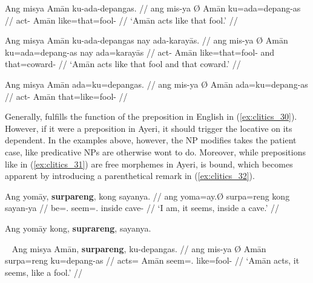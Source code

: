 \a\label{ex:clitics_30d}\begingl
	\gla Ang misya {} Amān ku-ada-depangas. //
	\glb ang mis-ya Ø Amān ku=ada=depang-as //
	\glc \AgtT{} act-\TsgM{} \Top{} Amān like=that=fool-\Parg{} //
	\glft `Amān acts like that fool.' //
\endgl

\a\label{ex:clitics_30e}\begingl
	\gla Ang misya {} Amān ku-ada-depangas nay ada-karayās. //
	\glb ang mis-ya Ø Amān ku=ada=depang-as nay ada=karayās //
	\glc \AgtT{} act-\TsgM{} \Top{} Amān like=that=fool-\Parg{} and 
		that=coward-\Parg{} //
	\glft `Amān acts like that fool and that coward.' //
\endgl

\a\label{ex:clitics_30f}\ljudge{*}\begingl
	\gla Ang misya {} Amān ada=ku=depangas. //
	\glb ang mis-ya Ø Amān ada=ku=depang-as //
	\glc \AgtT{} act-\TsgM{} \Top{} Amān that=like=fool-\Parg{} //
\endgl
\xe

Generally,  fulfills the function of the preposition 
in English in (\ref{ex:clitics_30}). However, if it were a preposition in
Ayeri, it should trigger the locative on its dependent. In the examples above,
however, the NP  modifies takes the patient case, like
predicative NPs are otherwise wont to do. Moreover, while prepositions like
 in (\ref{ex:clitics_31}) are free morphemes in Ayeri,
 is bound, which becomes apparent by introducing a parenthetical
remark in (\ref{ex:clitics_32}).

\pex\label{ex:clitics_31}
\a\label{ex:clitics_31a}\begingl
	\gla Ang yomāy, \textbf{surpareng}, kong sayanya. //
	\glb ang yoma=ay.Ø surpa=reng kong sayan-ya //
	\glc \AgtT{} be=\Fsg{}.\Top{} seem=\TsgI{}.\Aarg{} inside cave-\Loc{} //
	\glft `I am, it seems, inside a cave.' //
\endgl


\a\label{ex:clitics_31b}
	Ang yomāy kong, \textbf{suprareng}, sayanya.
\xe

\pex~\label{ex:clitics_32}
\a\label{ex:clitics_32a}\begingl
	\gla Ang misya {} Amān, \textbf{surpareng}, ku-depangas. //
	\glb ang mis-ya Ø Amān surpa=reng ku=depang-as //
	\glc \AgtT{} acts=\TsgM{} \Top{} Amān seem=\TsgI{}.\Aarg{} 
		like=fool-\Parg{} //
	\glft `Amān acts, it seems, like a fool.' //
\endgl


